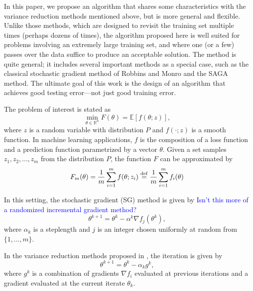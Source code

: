 \documentclass[11pt]{article}
\newcommand{\defeq}{\stackrel{\rm def}{=}}
\begin{document}
In this paper, we propose an algorithm that shares some characteristics with the variance reduction methods mentioned above, but is more general and flexible. Unlike those methods, which are designed to revisit the training set multiple times (perhaps dozens of times), the algorithm proposed here is well suited for problems involving an extremely large training set, and where one (or a few) passes over the data suffice to produce an acceptable solution. The method is quite general; it includes several important methods as a special case, such as the classical stochastic gradient method of Robbins and Monro and the SAGA method. The ultimate goal of this work is the design of an algorithm that achieves good testing error---not just good training error.

The problem of interest is stated as
\begin{equation}  \label{risk}
	\min_{\theta \in \mathbb{R}^n} F(\theta) = \mathbb{E}[ f(\theta;z)] ,
\end{equation}
where $z$ is a random variable with distribution $P$ and $f(\cdot;z)$ is a smooth function. In machine learning applications, $f$ is the composition of a  loss function and a prediction function parametrized by a vector $\theta$.  Given a set samples $z_1, z_2, \ldots , z_m$ from the distribution $P$, the function $F$ can be approximated by 
\begin{equation}
	\label{saa}
	F_m(\theta) = \frac{1}{m} \sum_{i=1}^m f(\theta; z_i) \defeq \frac{1}{m} \sum_{i=1}^mf_i(\theta)  
\end{equation}

In this setting, the stochastic gradient (SG) method is given by \textcolor{blue}{Isn't this more of a randomized incremental gradient method?}
\[ \theta^{k+1} = \theta^k- \alpha^k  \nabla f_j(\theta^k), \]
where $\alpha_k$ is a steplength and $j$ is an integer chosen uniformly at random from $\{1, \ldots, m\}$. 

In the variance reduction methods proposed in \cite{roux2012stochastic,NIPS2014_5258}, the iteration is given by
\begin{equation}   \label{iteration}
   	 \theta^{k+1} = \theta^k - \alpha_k  g^k ,
\end{equation}
where $g^k$ is a combination of gradients $\nabla f_i$ evaluated at previous iterations and a gradient evaluated at the current iterate $\theta_k$. 
\end{document}
